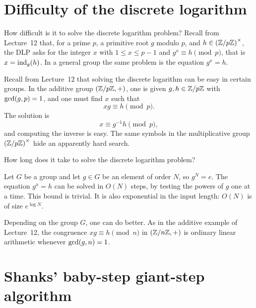 

\section{Difficulty of the discrete logarithm}

How difficult is it to solve the discrete logarithm problem?
Recall from Lecture~12 that, for a prime \(p\), a primitive root \(g\) modulo \(p\), and \(h\in\left(\mathbb Z/p\mathbb Z\right)^\times\), the DLP asks for the integer \(x\) with \(1\le x\le p-1\) and \(g^{x}\equiv h\pmod{p}\), that is \(x=\operatorname{ind}_{g}(h)\). In a general group the same problem is the equation \(g^{x}=h\).

\begin{example}
Recall from Lecture~12 that solving the discrete logarithm can be easy in certain groups.
In the additive group \((\mathbb Z/p\mathbb Z,+)\), one is given \(g,h\in\mathbb Z/p\mathbb Z\) with
\(\operatorname{gcd}(g,p)=1\), and one must find \(x\) such that
\[
    xg \equiv h \pmod{p}.
\]
The solution is
\[
    x \equiv g^{-1}h \pmod{p},
\]
and computing the inverse is easy. The same symbols in the multiplicative group \(\left(\mathbb Z/p\mathbb Z\right)^\times\) hide an apparently hard search.
\end{example}


How long does it take to solve the discrete logarithm problem?

\begin{remark}
Let \(G\) be a group and let \(g\in G\) be an element of order \(N\), so
\(g^N=e\). The equation \(g^x=h\) can be solved in \(O(N)\) steps, by
testing the powers of \(g\) one at a time. This bound is trivial. It is
also exponential in the input length: \(O(N)\) is of size \(e^{\log N}\).
\end{remark}

\begin{remark}
Depending on the group \(G\), one can do better. As in the additive example of Lecture~12, the congruence \(xg\equiv h\pmod{n}\) in \((\mathbb Z/n\mathbb Z,+)\) is ordinary linear arithmetic whenever \(\operatorname{gcd}(g,n)=1\).
\end{remark}

\section{Shanks' baby-step giant-step algorithm}

